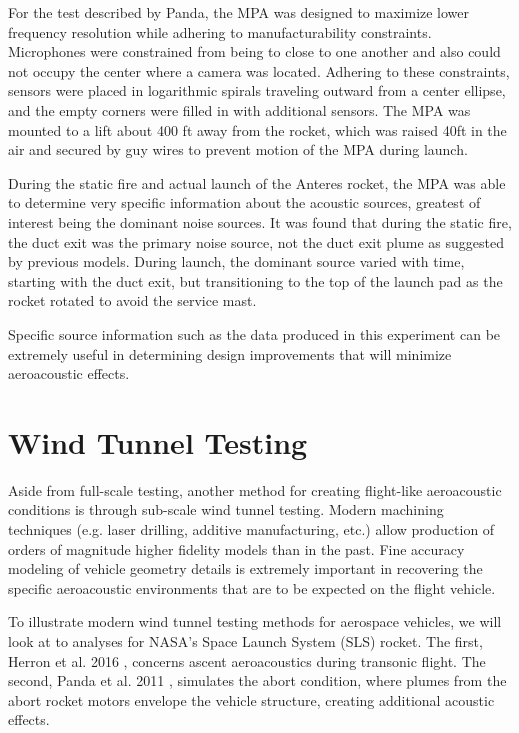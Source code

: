 \documentclass[]{aiaa-tc}%
\begin{document}
For the test described by Panda, the MPA was designed to maximize lower frequency resolution while adhering to manufacturability constraints.  Microphones were constrained from being to close to one another and also could not occupy the center where a camera was located.  Adhering to these constraints, sensors were placed in logarithmic spirals traveling outward from a center ellipse, and the empty corners were filled in with additional sensors.  The MPA was mounted to a lift about 400 ft away from the rocket, which was raised 40ft in the air and secured by guy wires to prevent motion of the MPA during launch.

During the static fire and actual launch of the Anteres rocket, the MPA was able to determine very specific information about the acoustic sources, greatest of interest being the dominant noise sources.  It was found that during the static fire, the duct exit was the primary noise source, not the duct exit plume as suggested by previous models.  During launch, the dominant source varied with time, starting with the duct exit, but transitioning to the top of the launch pad as the rocket rotated to avoid the service mast.

Specific source information such as the data produced in this experiment can be extremely useful in determining design improvements that will minimize aeroacoustic effects.





\section{Wind Tunnel Testing}

Aside from full-scale testing, another method for creating flight-like aeroacoustic conditions is through sub-scale wind tunnel testing.  Modern machining techniques (e.g. laser drilling, additive manufacturing, etc.)\cite{SLSAscentWTT} allow production of orders of magnitude higher fidelity models than in the past.  Fine accuracy modeling of vehicle geometry details is extremely important in recovering the specific aeroacoustic environments that are to be expected on the flight vehicle.

To illustrate modern wind tunnel testing methods for aerospace vehicles, we will look at to analyses for NASA's Space Launch System (SLS) rocket.  The first, Herron et al. 2016 \cite{SLSAscentWTT}, concerns ascent aeroacoustics during transonic flight.  The second, Panda et al. 2011 \cite{HeatedHeliumWTT}, simulates the abort condition, where plumes from the abort rocket motors envelope the vehicle structure, creating additional acoustic effects.
\end{document}
